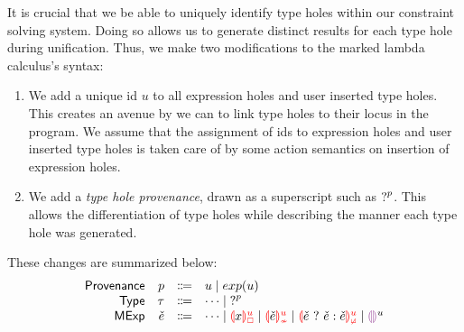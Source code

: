 \label{sec:typinf}
It is crucial that we be able to uniquely identify type holes within our constraint solving system. Doing so allows us to generate distinct results for each type hole during unification. Thus, we make two modifications to the marked lambda calculus's syntax:
\begin{enumerate}
    \item We add a unique id $u$ to all expression holes and user inserted type holes. This creates an avenue by we can to link type holes to their locus in the program. We assume that the assignment of ids to expression holes and user inserted type holes is taken care of by some action semantics on insertion of expression holes. 
    \item We add a \emph{type hole provenance}, drawn as a superscript such as $\mathtt{?}^p$. This allows the differentiation of type holes while describing the manner each type hole was generated.
\end{enumerate}
  
These changes are summarized below:
\[\begin{array}{rrcl}
    \Prov & \Provp & \Coloneqq & u \mid exp(u) \\
    \TMName  & \TMV  & \Coloneqq & \dots \mid \TUnknown^{p}\\
    \ECMName & \ECMV & \Coloneqq & \dots \mid \ECUnboundId{x}{u} \mid \ECInconTypeId{\ECMV}{u} \mid \ECInconBrId{\ECMV}{\ECMV}{\ECMV}{u} \mid \EEHole^u
\end{array}\]


